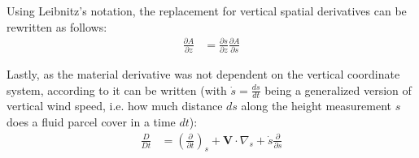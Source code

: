 Using Leibnitz's notation, the replacement for vertical spatial derivatives can be rewritten as follows:
\begin{align}
\frac{\partial A}{\partial z} &= \frac{\partial s}{\partial z} \frac{\partial A}{\partial s}\label{id_v_diff}
\end{align}

Lastly, as the material derivative was not dependent on the vertical coordinate system, according to \cite{kasahara1974various} it can be written (with $\dot{s}=\frac{ds}{dt}$ being a generalized version of vertical wind speed, i.e. how much distance $ds$ along the height measurement $s$ does a fluid parcel cover in a time $dt$):
\begin{align}
\frac{D}{Dt} &= \left(\frac{\partial}{\partial t}\right)_s + \textbf{V} \cdot \nabla _s + \dot{s}\frac{\partial }{\partial s}\label{id_t_diff}
\end{align}




